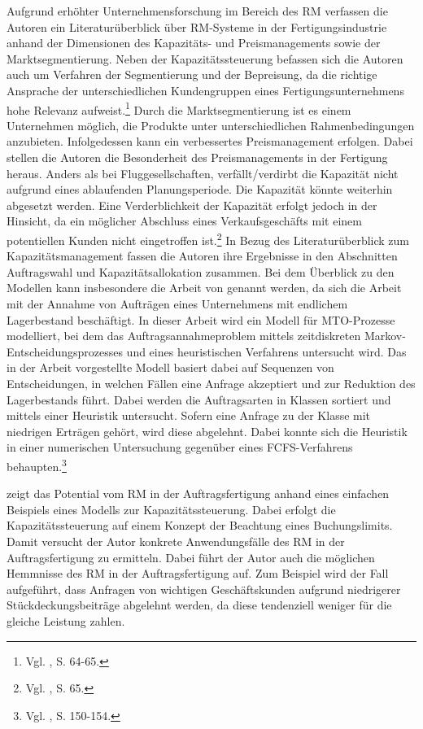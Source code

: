 Aufgrund erhöhter Unternehmensforschung im Bereich des RM verfassen die Autoren \cite{cheraghi2010revenue} ein Literaturüberblick über RM-Systeme in der Fertigungsindustrie anhand der Dimensionen des Kapazitäts- und Preismanagements sowie der Marktsegmentierung. Neben der Kapazitätssteuerung befassen sich die Autoren auch um Verfahren der Segmentierung und der Bepreisung, da die richtige Ansprache der unterschiedlichen Kundengruppen eines Fertigungsunternehmens hohe Relevanz aufweist.\footnote{Vgl. \cite{cheraghi2010revenue}, S. 64-65.} Durch die Marktsegmentierung ist es einem Unternehmen möglich, die Produkte unter unterschiedlichen Rahmenbedingungen anzubieten. Infolgedessen kann ein verbessertes Preismanagement erfolgen. Dabei stellen die Autoren die Besonderheit des Preismanagements in der Fertigung heraus. Anders als bei Fluggesellschaften, verfällt/verdirbt die Kapazität nicht aufgrund eines ablaufenden Planungsperiode. Die Kapazität könnte weiterhin abgesetzt werden. Eine Verderblichkeit der Kapazität erfolgt jedoch in der Hinsicht, da ein möglicher Abschluss eines Verkaufsgeschäfts mit einem potentiellen Kunden nicht eingetroffen ist.\footnote{Vgl. \cite{cheraghi2010revenue}, S. 65.} In Bezug des Literaturüberblick zum Kapazitätsmanagement fassen die Autoren ihre Ergebnisse in den Abschnitten \glqq Auftragswahl{\grqq} und \glqq Kapazitätsallokation{\grqq} zusammen. Bei dem Überblick zu den Modellen kann insbesondere die Arbeit von \cite{Defregger:2007aa} genannt werden, da sich die Arbeit mit der Annahme von Aufträgen eines Unternehmens mit endlichem Lagerbestand beschäftigt. In dieser Arbeit wird ein Modell für MTO-Prozesse modelliert, bei dem das Auftragsannahmeproblem mittels zeitdiskreten Markov-Entscheidungsprozesses und eines heuristischen Verfahrens untersucht wird. Das in der Arbeit vorgestellte Modell basiert dabei auf Sequenzen von Entscheidungen, in welchen Fällen eine Anfrage akzeptiert und zur Reduktion des Lagerbestands führt. Dabei werden die Auftragsarten in Klassen sortiert und mittels einer Heuristik untersucht. Sofern eine Anfrage zu der Klasse mit niedrigen Erträgen gehört, wird diese abgelehnt. Dabei konnte sich die Heuristik in einer numerischen Untersuchung gegenüber eines FCFS-Verfahrens behaupten.\footnote{Vgl.  \cite{Defregger:2007aa}, S. 150-154.}

\cite{sucky2009revenue} zeigt das Potential vom RM in der Auftragsfertigung anhand eines einfachen Beispiels eines Modells zur Kapazitätssteuerung. Dabei erfolgt die Kapazitätssteuerung auf einem Konzept der Beachtung eines Buchungslimits. Damit versucht der Autor konkrete Anwendungsfälle des RM in der Auftragsfertigung zu ermitteln. Dabei führt der Autor auch die möglichen Hemmnisse des RM in der Auftragsfertigung auf. Zum Beispiel wird der Fall aufgeführt, dass Anfragen von wichtigen Geschäftskunden aufgrund niedrigerer Stückdeckungsbeiträge abgelehnt werden, da diese tendenziell weniger für die gleiche Leistung zahlen.

